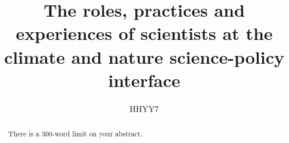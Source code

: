 
\title{The roles, practices and experiences of scientists at the climate and nature science-policy interface}
\author{HHYY7}%
\raggedbottom
\maketitle

\newpage
\makedeclaration

\begin{abstract} %
There is a 300-word limit on your abstract.
\end{abstract}

